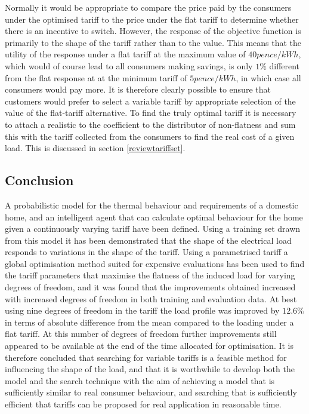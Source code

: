 \documentclass[a4paper, 10 pt, conference]{ieeeconf}  %
\begin{document}
Normally it would be appropriate to compare the price paid by the consumers under the optimised tariff to the price under the flat tariff to determine whether there is an incentive to switch. However, the response of the objective function is primarily to the shape of the tariff rather than to the value. This means that the utility of the response under a flat tariff at the maximum value of $40 pence /kWh$, which would of course lead to all consumers making savings, is only $1\%$ different from the flat response at at the minimum tariff of $5 pence /kWh$, in which case all consumers would pay more. It is therefore clearly possible to ensure that customers would prefer to select a variable tariff by appropriate selection of the value of the flat-tariff alternative. To find the truly optimal tariff it is necessary to attach a realistic to the coefficient to the distributor of non-flatness and sum this with the tariff collected from the consumers to find the real cost of a given load. This is discussed in section \ref{reviewtariffset}.

\subsection{Conclusion}
A probabilistic model for the thermal behaviour and requirements of a domestic home, and an intelligent agent that can calculate optimal behaviour for the home given a continuously varying tariff have been defined. Using a training set drawn from this model it has been demonstrated that the shape of the electrical load responds to variations in the shape of the tariff. Using a parametrised tariff a global optimisation method suited for expensive evaluations has been used to find the tariff parameters that maximise the flatness of the induced load for varying degrees of freedom, and it was found that the improvements obtained increased with increased degrees of freedom in both training and evaluation data. At best using nine degrees of freedom in the tariff the load profile was improved by $12.6\%$ in terms of absolute difference from the mean compared to the loading under a flat tariff. At this number of degrees of freedom further improvements still appeared to be available at the end of the time allocated for optimisation. It is therefore concluded that searching for variable tariffs is a feasible method for influencing the shape of the load, and that it is worthwhile to develop both the model and the search technique with the aim of achieving a model that is sufficiently similar to real consumer behaviour, and searching that is sufficiently efficient that tariffs can be proposed for real application in reasonable time. 
\end{document}
